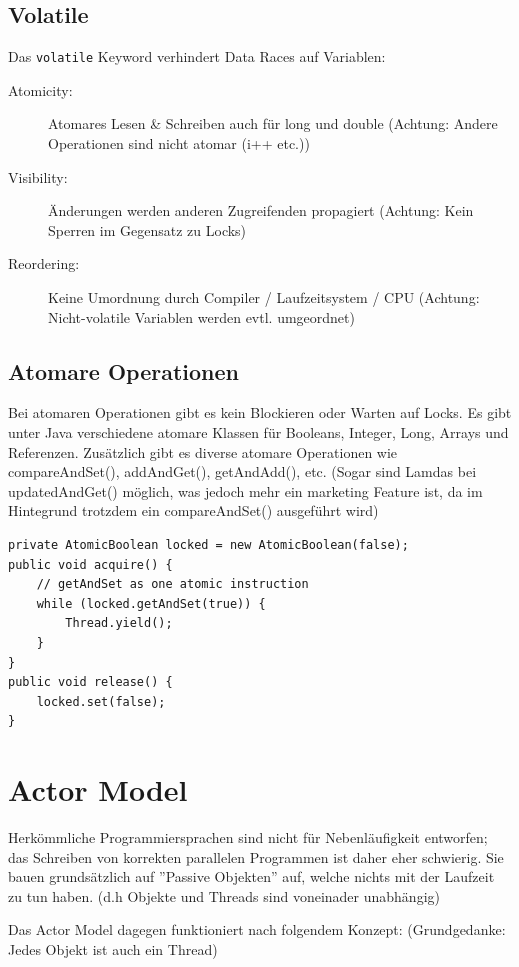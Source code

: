 \subsection{Volatile}
Das \lstinline|volatile| Keyword verhindert Data Races auf Variablen:
\begin{description}
	\item[Atomicity:] Atomares Lesen \& Schreiben auch für long und double
 (Achtung: Andere Operationen sind nicht atomar (i++ etc.))
	\item[Visibility:] Änderungen werden anderen Zugreifenden propagiert
(Achtung: Kein Sperren im Gegensatz zu Locks)
	\item[Reordering:] Keine Umordnung durch Compiler / Laufzeitsystem / CPU
 (Achtung: Nicht-volatile Variablen werden evtl. umgeordnet)
\end{description}

\subsection{Atomare Operationen}
Bei atomaren Operationen gibt es kein Blockieren oder Warten auf Locks. Es gibt unter Java verschiedene atomare Klassen für Booleans, Integer, Long, Arrays und Referenzen. Zusätzlich gibt es diverse atomare Operationen wie compareAndSet(), addAndGet(), getAndAdd(), etc. (Sogar sind Lamdas bei updatedAndGet() möglich, was jedoch mehr ein marketing Feature ist, da im Hintegrund trotzdem ein compareAndSet() ausgeführt wird)
\begin{lstlisting}
private AtomicBoolean locked = new AtomicBoolean(false);
public void acquire() {
	// getAndSet as one atomic instruction
	while (locked.getAndSet(true)) {
		Thread.yield();
	}
}
public void release() {
	locked.set(false);
}
\end{lstlisting}


\section{Actor Model}

Herkömmliche Programmiersprachen sind nicht für Nebenläufigkeit entworfen; das Schreiben von korrekten parallelen Programmen ist daher eher schwierig. Sie bauen grundsätzlich auf ''Passive Objekten'' auf, welche nichts mit der Laufzeit zu tun haben. (d.h Objekte und Threads sind voneinader unabhängig)

Das Actor Model dagegen funktioniert nach folgendem Konzept: (Grundgedanke: Jedes Objekt ist auch ein Thread)

